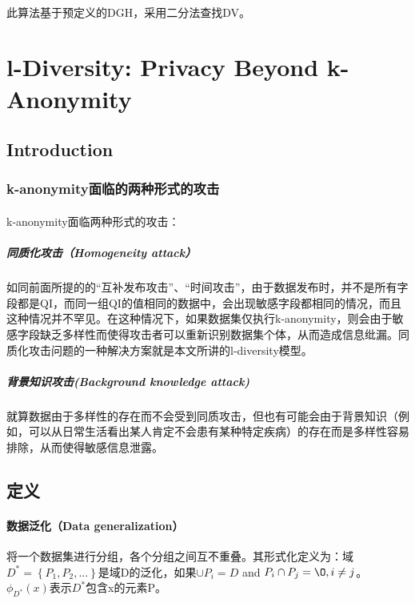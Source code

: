 \documentclass[12pt,a4paper]{article}
\begin{document}
\paragraph{} 此算法基于预定义的DGH，采用二分法查找DV。
















\section{l-Diversity: Privacy Beyond k-Anonymity\cite{l-diversity} }

\subsection{Introduction}
\subsubsection{k-anonymity面临的两种形式的攻击}
\paragraph{} k-anonymity面临两种形式的攻击：
	\subparagraph{同质化攻击（Homogeneity attack）} 如同前面所提的的“互补发布攻击”、“时间攻击”，由于数据发布时，并不是所有字段都是QI，而同一组QI的值相同的数据中，会出现敏感字段都相同的情况，而且这种情况并不罕见。在这种情况下，如果数据集仅执行k-anonymity，则会由于敏感字段缺乏多样性而使得攻击者可以重新识别数据集个体，从而造成信息纰漏。同质化攻击问题的一种解决方案就是本文所讲的l-diversity模型。
	\subparagraph{背景知识攻击(Background knowledge attack)} 就算数据由于多样性的存在而不会受到同质攻击，但也有可能会由于背景知识（例如，可以从日常生活看出某人肯定不会患有某种特定疾病）的存在而是多样性容易排除，从而使得敏感信息泄露。
	
\subsection{定义}
\paragraph{数据泛化（Data generalization）} 将一个数据集进行分组，各个分组之间互不重叠。其形式化定义为：域$D^*=\left \{P_1,P_2,...\right \}$是域D的泛化，如果$\cup P_i = D$ and $P_i \cap P_j = \O, i \neq j $。$\phi_{D^*}(x)$表示$D^*$包含x的元素P。
\end{document}
